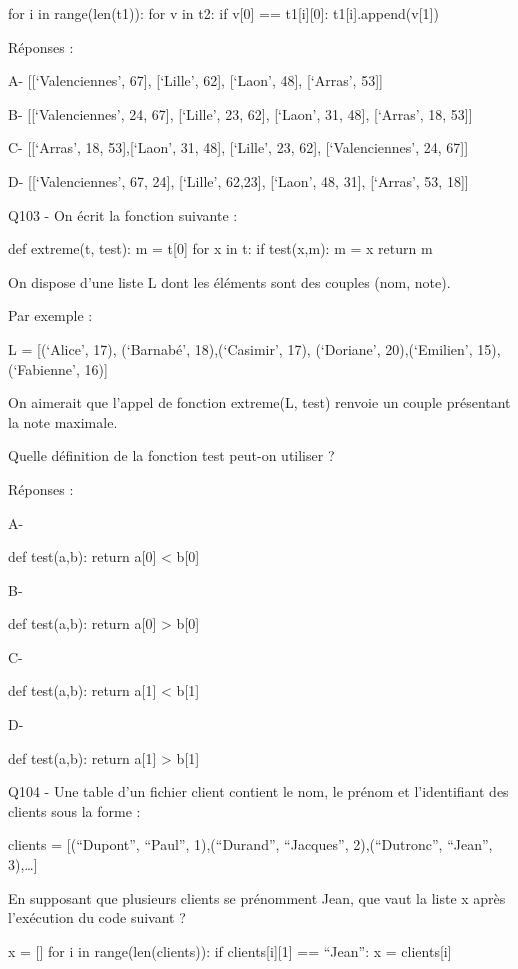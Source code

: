 \documentclass[
]{book}
\begin{document}
for i in range(len(t1)):
for v in t2:
if v{[}0{]} == t1{[}i{]}{[}0{]}:
t1{[}i{]}.append(v{[}1{]})

Réponses :

A- {[}{[}`Valenciennes', 67{]}, {[}`Lille', 62{]}, {[}`Laon', 48{]}, {[}`Arras', 53{]}{]}

B- {[}{[}`Valenciennes', 24, 67{]}, {[}`Lille', 23, 62{]}, {[}`Laon', 31, 48{]}, {[}`Arras', 18, 53{]}{]}

C- {[}{[}`Arras', 18, 53{]},{[}`Laon', 31, 48{]}, {[}`Lille', 23, 62{]}, {[}`Valenciennes', 24, 67{]}{]}

D- {[}{[}`Valenciennes', 67, 24{]}, {[}`Lille', 62,23{]}, {[}`Laon', 48, 31{]}, {[}`Arras', 53, 18{]}{]}

Q103 - On écrit la fonction suivante :

def extreme(t, test):
m = t{[}0{]}
for x in t:
if test(x,m):
m = x
return m

On dispose d'une liste L dont les éléments sont des couples (nom, note).

Par exemple :

L = {[}(`Alice', 17), (`Barnabé', 18),(`Casimir', 17), (`Doriane', 20),(`Emilien', 15), (`Fabienne', 16){]}

On aimerait que l'appel de fonction extreme(L, test) renvoie un couple présentant la note maximale.

Quelle définition de la fonction test peut-on utiliser ?

Réponses :

A-

def test(a,b):
return a{[}0{]} \textless{} b{[}0{]}

B-

def test(a,b):
return a{[}0{]} \textgreater{} b{[}0{]}

C-

def test(a,b):
return a{[}1{]} \textless{} b{[}1{]}

D-

def test(a,b):
return a{[}1{]} \textgreater{} b{[}1{]}

Q104 - Une table d'un fichier client contient le nom, le prénom et l'identifiant des clients sous la forme :

clients = {[}(``Dupont'', ``Paul'', 1),(``Durand'', ``Jacques'', 2),(``Dutronc'', ``Jean'', 3),\ldots{]}

En supposant que plusieurs clients se prénomment Jean, que vaut la liste x après l'exécution du code suivant ?

x = {[}{]}
for i in range(len(clients)):
if clients{[}i{]}{[}1{]} == ``Jean'':
x = clients{[}i{]}
\end{document}
